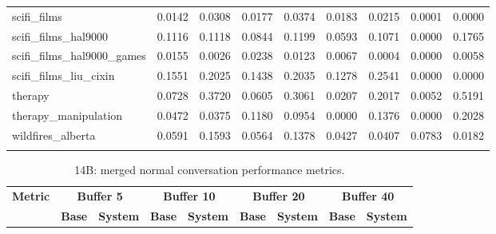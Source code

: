 \documentclass[pdflatex,sn-mathphys-num]{sn-jnl}%
\theoremstyle{thmstyleone}%
\theoremstyle{thmstyletwo}%
\theoremstyle{thmstylethree}%
\begin{document}
\begin{appendices}
\begin{landscape}
\begin{longtable}{@{}p{3.8cm}cccccccc@{}}
scifi\_films & 0.0142 & 0.0308 & 0.0177 & 0.0374 & 0.0183 & 0.0215 & 0.0001 & 0.0000 \\
scifi\_films\_hal9000 & 0.1116 & 0.1118 & 0.0844 & 0.1199 & 0.0593 & 0.1071 & 0.0000 & 0.1765 \\
scifi\_films\_hal9000\_games & 0.0155 & 0.0026 & 0.0238 & 0.0123 & 0.0067 & 0.0004 & 0.0000 & 0.0058 \\
scifi\_films\_liu\_cixin & 0.1551 & 0.2025 & 0.1438 & 0.2035 & 0.1278 & 0.2541 & 0.0000 & 0.0000 \\
therapy & 0.0728 & 0.3720 & 0.0605 & 0.3061 & 0.0207 & 0.2017 & 0.0052 & 0.5191 \\
therapy\_manipulation & 0.0472 & 0.0375 & 0.1180 & 0.0954 & 0.0000 & 0.1376 & 0.0000 & 0.2028 \\
wildfires\_alberta & 0.0591 & 0.1593 & 0.0564 & 0.1378 & 0.0427 & 0.0407 & 0.0783 & 0.0182 \\
\botrule
\end{longtable}
\normalsize
\end{landscape}
\begin{landscape}
\tiny
\begin{longtable}{@{}p{3.8cm}cccccccc@{}}
\caption{14B: merged normal conversation performance metrics.}\label{tab:app_14b_perf_normal}\\

\toprule
\textbf{Metric} & \multicolumn{2}{c}{\textbf{Buffer 5}} & \multicolumn{2}{c}{\textbf{Buffer 10}} & \multicolumn{2}{c}{\textbf{Buffer 20}} & \multicolumn{2}{c}{\textbf{Buffer 40}} \\
\cmidrule(lr){2-3}\cmidrule(lr){4-5}\cmidrule(lr){6-7}\cmidrule(lr){8-9}
 & \textbf{Base} & \textbf{System} & \textbf{Base} & \textbf{System} & \textbf{Base} & \textbf{System} & \textbf{Base} & \textbf{System} \\
\midrule
\endfirsthead


\end{longtable}
\end{landscape}
\end{appendices}
\end{document}
